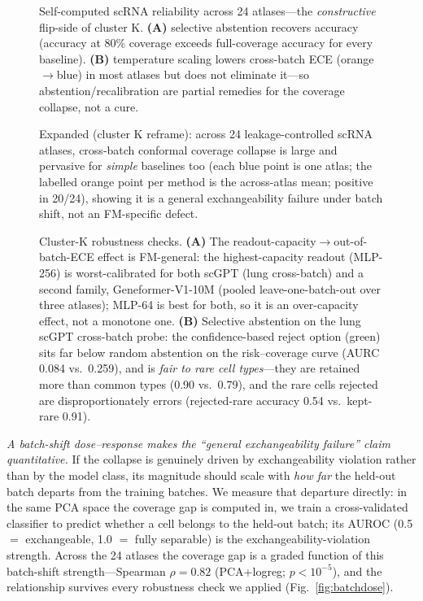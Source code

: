 \documentclass[11pt]{article}
\begin{document}
\begin{figure}[htb]\centering
\caption{Self-computed scRNA reliability across 24 atlases---the \emph{constructive} flip-side of cluster K. \textbf{(A)} selective abstention recovers accuracy (accuracy at 80\% coverage exceeds full-coverage accuracy for every baseline). \textbf{(B)} temperature scaling lowers cross-batch ECE (orange$\to$blue) in most atlases but does not eliminate it---so abstention/recalibration are partial remedies for the coverage collapse, not a cure.}\label{fig:scrnarel}\end{figure}

\begin{figure}[htb]\centering
\caption{Expanded (cluster K reframe): across 24 leakage-controlled scRNA atlases, cross-batch conformal coverage collapse is large and pervasive for \emph{simple} baselines too (each blue point is one atlas; the labelled orange point per method is the across-atlas mean; positive in 20/24), showing it is a general exchangeability failure under batch shift, not an FM-specific defect.}\label{fig:multicov}\end{figure}

\begin{figure}[htb]\centering
\caption{Cluster-K robustness checks. \textbf{(A)} The readout-capacity$\to$out-of-batch-ECE effect is FM-general: the highest-capacity readout (MLP-256) is worst-calibrated for both scGPT (lung cross-batch) and a second family, Geneformer-V1-10M (pooled leave-one-batch-out over three atlases); MLP-64 is best for both, so it is an over-capacity effect, not a monotone one. \textbf{(B)} Selective abstention on the lung scGPT cross-batch probe: the confidence-based reject option (green) sits far below random abstention on the risk--coverage curve (AURC 0.084 vs.\ 0.259), and is \emph{fair to rare cell types}---they are retained more than common types (0.90 vs.\ 0.79), and the rare cells rejected are disproportionately errors (rejected-rare accuracy 0.54 vs.\ kept-rare 0.91).}\label{fig:kaddon}\end{figure}

\emph{A batch-shift dose--response makes the ``general exchangeability failure'' claim quantitative.} If the collapse is genuinely driven by exchangeability violation rather than by the model class, its magnitude should scale with \emph{how far} the held-out batch departs from the training batches. We measure that departure directly: in the same PCA space the coverage gap is computed in, we train a cross-validated classifier to predict whether a cell belongs to the held-out batch; its AUROC (0.5 $=$ exchangeable, 1.0 $=$ fully separable) is the exchangeability-violation strength. Across the 24 atlases the coverage gap is a graded function of this batch-shift strength---Spearman $\rho=0.82$ (PCA+logreg; $p<10^{-5}$), and the relationship survives every robustness check we applied (Fig.~\ref{fig:batchdose}).
\end{document}
